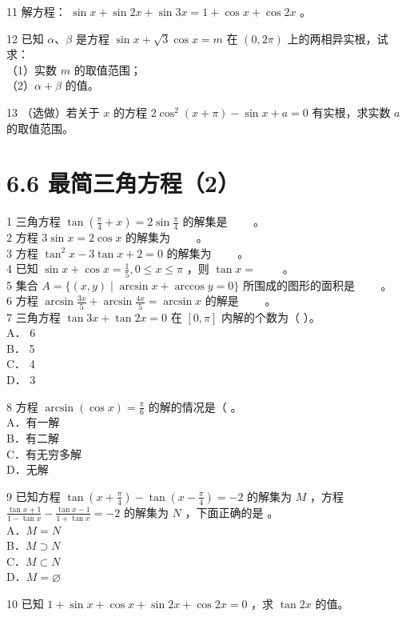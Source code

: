 \documentclass[10pt]{article}
\begin{document}
11 解方程： \(\sin x+\sin 2 x+\sin 3 x=1+\cos x+\cos 2 x\) 。

12 已知 \(\alpha 、 \beta\) 是方程 \(\sin x+\sqrt{3} \cos x=m\) 在 \((0,2 \pi)\) 上的两相异实根，试求：\\
（1）实数 \(m\) 的取值范围；\\
（2）\(\alpha+\beta\) 的值。

13 （选做）若关于 \(x\) 的方程 \(2 \cos ^{2}(x+\pi)-\sin x+a=0\) 有实根，求实数 \(a\) 的取值范围。

\section*{6.6 最简三角方程（2）}
1 三角方程 \(\tan \left(\frac{\pi}{4}+x\right)=2 \sin \frac{\pi}{4}\) 的解集是 \(\qquad\)。\\
2 方程 \(3 \sin x=2 \cos x\) 的解集为 \(\qquad\)。\\
3 方程 \(\tan ^{2} x-3 \tan x+2=0\) 的解集为 \(\qquad\)。\\
4 已知 \(\sin x+\cos x=\frac{1}{5}, 0 \leqslant x \leqslant \pi\) ，则 \(\tan x=\) \(\qquad\)。\\
5 集合 \(A=\{(x, y) \mid \arcsin x+\arccos y=0\}\) 所围成的图形的面积是 \(\qquad\)。\\
6 方程 \(\arcsin \frac{3 x}{5}+\arcsin \frac{4 x}{5}=\arcsin x\) 的解是 \(\qquad\)。\\
7 三角方程 \(\tan 3 x+\tan 2 x=0\) 在 \([0, \pi]\) 内解的个数为（ ）。\\
A． 6\\
B． 5\\
C． 4\\
D． 3

8 方程 \(\arcsin (\cos x)=\frac{\pi}{6}\) 的解的情况是（ 。\\
A．有一解\\
B．有二解\\
C．有无穷多解\\
D．无解

9 已知方程 \(\tan \left(x+\frac{\pi}{4}\right)-\tan \left(x-\frac{\pi}{4}\right)=-2\) 的解集为 \(M\) ，方程 \(\frac{\tan x+1}{1-\tan x}-\frac{\tan x-1}{1+\tan x}=-2\) 的解集为 \(N\) ，下面正确的是 。\\
A．\(M=N\)\\
B．\(M \supset N\)\\
C．\(M \subset N\)\\
D．\(M=\varnothing\)

10 已知 \(1+\sin x+\cos x+\sin 2 x+\cos 2 x=0\) ，求 \(\tan 2 x\) 的值。
\end{document}
